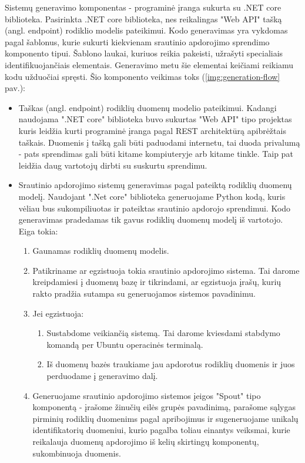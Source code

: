 \documentclass{VUMIFPSbakalaurinis}
\begin{document}
Sistemų generavimo komponentas - programinė įranga sukurta su .NET core biblioteka. Pasirinkta .NET core biblioteka, nes reikalingas "Web API" tašką (angl. endpoint) rodiklio modelis pateikimui. 
Kodo generavimas yra vykdomas pagal šablonus, kurie sukurti kiekvienam srautinio apdorojimo sprendimo komponento tipui. Šablono laukai, kuriuos reikia pakeisti, užrašyti specialiais identifikuojančiais elementais. Generavimo metu šie elementai keičiami reikiamu kodu užduočiai spręsti.
Šio komponento veikimas toks (\ref{img:generation-flow} pav.):
\begin{itemize}
    \item Taškas (angl. endpoint) rodiklių duomenų modelio pateikimui. Kadangi naudojama ".NET core" biblioteka buvo sukurtas "Web API" tipo projektas kuris leidžia kurti programinė įranga pagal REST architektūrą apibrėžtais taškais. Duomenis į tašką gali būti paduodami internetu, tai duoda privalumą - pats sprendimas gali būti kitame kompiuteryje arb kitame tinkle. Taip pat leidžia daug vartotojų dirbti su suskurtu sprendimu.
    \item Srautinio apdorojimo sistemų generavimas pagal pateiktą rodiklių duomenų modelį. Naudojant ".Net core" biblioteka generuojame Python kodą, kuris vėliau bus sukompiliuotas ir pateiktas srautinio apdorojo sprendimui. Kodo generavimas pradedamas tik gavus rodiklių duomenų modelį iš vartotojo. Eiga tokia:
    \begin{enumerate}
        \item Gaunamas rodiklių duomenų modelis.
        \item Patikriname ar egzistuoja tokia srautinio apdorojimo sistema. Tai darome kreipdamiesi į duomenų bazę ir tikrindami, ar egzistuoja įrašų, kurių rakto pradžia sutampa su generuojamos sistemos pavadinimu.
        \item Jei egzistuoja:
            \begin{enumerate}
                \item Sustabdome veikiančią sistemą. Tai darome kviesdami stabdymo komandą per Ubuntu operacinės terminalą.
                \item Iš duomenų bazės traukiame jau apdorotus rodiklių duomenis ir juos perduodame į generavimo dalį.
            \end{enumerate} 
        \item Generuojame srautinio apdorojimo sistemos įeigos "Spout" tipo komponentą - įrašome žinučių eilės grupės pavadinimą, parašome sąlygas pirminių rodiklių duomenims pagal apribojimus ir sugeneruojame unikalų identifikatorių duomeniui, kurio pagalba toliau einantys veiksmai, kurie reikalauja duomenų apdorojimo iš kelių skirtingų komponentų, sukombinuoja duomenis.

\end{enumerate}
\end{itemize}
\end{document}
